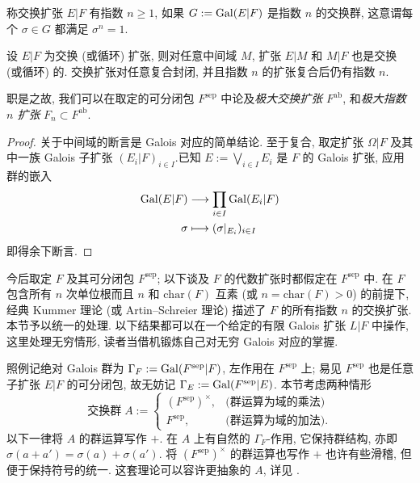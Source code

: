 \begin{convention}
	称交换扩张 $E|F$ 有指数 $n \geq 1$, 如果 $G := \operatorname{Gal}(E|F)$ 是指数 $n$ 的交换群, 这意谓每个 $\sigma \in G$ 都满足 $\sigma^n = 1$.
\end{convention}

\begin{proposition}
	设 $E|F$ 为交换 (或循环) 扩张, 则对任意中间域 $M$, 扩张 $E|M$ 和 $M|F$ 也是交换 (或循环) 的. 交换扩张对任意复合封闭, 并且指数 $n$ 的扩张复合后仍有指数 $n$.
\end{proposition}
职是之故, 我们可以在取定的可分闭包 $F^\text{sep}$ 中论及\emph{极大交换扩张} $F^\text{ab}$, 和\emph{极大指数 $n$ 扩张} $F_n \subset F^\text{ab}$.
\begin{proof}
	关于中间域的断言是 Galois 对应的简单结论. 至于复合, 取定扩张 $\Omega|F$ 及其中一族 Galois 子扩张 $(E_i|F)_{i \in I}$.已知 $E := \bigvee_{i \in I} E_i$ 是 $F$ 的 Galois 扩张, 应用群的嵌入
	\begin{align*}
		\operatorname{Gal}(E|F) & \longrightarrow \prod_{i \in I} \operatorname{Gal}(E_i|F) \\
		\sigma & \longmapsto (\sigma|_{E_i})_{i \in I}
	\end{align*}
	即得余下断言.
\end{proof}

今后取定 $F$ 及其可分闭包 $F^\text{sep}$; 以下谈及 $F$ 的代数扩张时都假定在 $F^\text{sep}$ 中. 在 $F$ 包含所有 $n$ 次单位根而且 $n$ 和 $\text{char}(F)$ 互素 (或 $n = \text{char}(F) > 0$) 的前提下, 经典 Kummer 理论 (或 Artin--Schreier 理论) 描述了 $F$ 的所有指数 $n$ 的交换扩张. 本节予以统一的处理. 以下结果都可以在一个给定的有限 Galois 扩张 $L|F$ 中操作, 这里处理无穷情形, 读者当借机锻炼自己对无穷 Galois 对应的掌握.

照例记绝对 Galois 群为 $\Gamma_F := \operatorname{Gal}(F^\text{sep}|F)$, 左作用在 $F^\text{sep}$ 上; 易见 $F^\text{sep}$ 也是任意子扩张 $E|F$ 的可分闭包, 故无妨记 $\Gamma_E := \operatorname{Gal}(F^\text{sep}|E)$. 本节考虑两种情形
\begin{equation}\label{eqn:Kummer-A}
	\text{交换群}\; A := \begin{cases}
		(F^\text{sep})^\times, & \text{(群运算为域的乘法)} \\
		F^\text{sep}, & \text{(群运算为域的加法)}.
\end{cases}\end{equation}
以下一律将 $A$ 的群运算写作 $+$. 在 $A$ 上有自然的 $\Gamma_F$-作用, 它保持群结构, 亦即 $\sigma(a+a') = \sigma(a)+\sigma(a')$. 将 $(F^\text{sep})^\times$ 的群运算也写作 $+$ 也许有些滑稽, 但便于保持符号的统一. 这套理论可以容许更抽象的 $A$, 详见 \cite[IV.3]{Neu99}.

